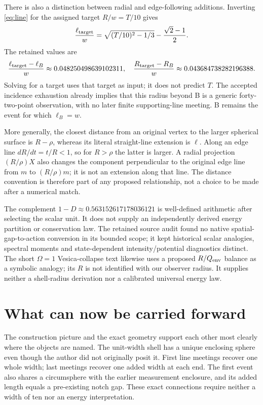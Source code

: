 \documentclass[11pt,a4paper]{article}
\begin{document}
There is also a distinction between radial and edge-following additions. Inverting \eqref{eq:line} for the assigned target $R/w=T/10$ gives
\begin{equation}\label{eq:target-extension}
\frac{\ell_{\rm target}}{w}
=\sqrt{(T/10)^2-1/3}-\frac{\sqrt2-1}{2}.
\end{equation}
The retained values are
\begin{equation}\label{eq:surpluses}
\frac{\ell_{\rm target}-\ell_B}{w}\approx0.048250498639102311,
\quad \frac{R_{\rm target}-R_B}{w}\approx0.043684738282196388 .
\end{equation}
Solving for a target uses that target as input; it does not predict $T$. The accepted incidence exhaustion already implies that this radius beyond B is a generic forty-two-point observation, with no later finite supporting-line meeting. B remains the event for which $\ell_B=w$.~\cite{TSZZeta,SP}

More generally, the closest distance from an original vertex to the larger spherical surface is $R-\rho$, whereas its literal straight-line extension is $\ell$. Along an edge line $dR/dt=t/R<1$, so for $R>\rho$ the latter is larger. A radial projection $(R/\rho)X$ also changes the component perpendicular to the original edge line from $m$ to $(R/\rho)m$; it is not an extension along that line. The distance convention is therefore part of any proposed relationship, not a choice to be made after a numerical match.~\cite[Sec.~4.1]{SP}~\cite{TSZAtlas}

The complement $1-D\approx0.563152617178036121$ is well-defined arithmetic after selecting the scalar unit. It does not supply an independently derived energy partition or conservation law. The retained source audit found no native spatial-gap-to-action conversion in its bounded scope; it kept historical scalar analogies, spectral moments and state-dependent intensity/potential diagnostics distinct. The short $\Omega=1$ Vesica-collapse text likewise uses a proposed $R/Q_{\rm env}$ balance as a symbolic analogy; its $R$ is not identified with our observer radius. It supplies neither a shell-radius derivation nor a calibrated universal energy law.~\cite{TSZZeta,Omega}

\section{What can now be carried forward}
The construction picture and the exact geometry support each other most clearly where the objects are named. The unit-width shell has a unique enclosing sphere even though the author did not originally posit it. First line meetings recover one whole width; last meetings recover one added width at each end. The first event also shares a circumsphere with the earlier measurement enclosure, and its added length equals a pre-existing notch gap. These exact connections require neither a width of ten nor an energy interpretation.
\end{document}

